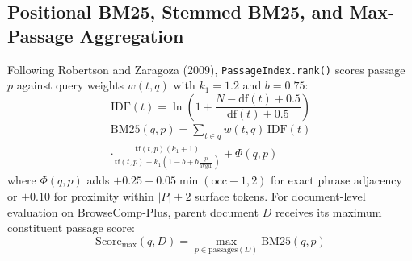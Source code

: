 \documentclass[conference]{IEEEtran}
\begin{document}
\subsection{Positional BM25, Stemmed BM25, and Max-Passage Aggregation}
Following Robertson and Zaragoza (2009), \texttt{PassageIndex.rank()} scores passage $p$ against query weights $w(t, q)$ with $k_1 = 1.2$ and $b = 0.75$:
\begin{equation}
\text{IDF}(t) = \ln\!\left(1 + \frac{N - \text{df}(t) + 0.5}{\text{df}(t) + 0.5}\right)
\end{equation}
\begin{multline}
\text{BM25}(q, p) = \sum_{t \in q} w(t, q)\,\text{IDF}(t)\\
\cdot\frac{\text{tf}(t, p)(k_1 + 1)}{\text{tf}(t, p) + k_1\!\left(1 - b + b\frac{|p|}{\text{avgdl}}\right)} + \Phi(q, p)
\end{multline}
where $\Phi(q, p)$ adds $+0.25 + 0.05\min(\text{occ}-1, 2)$ for exact phrase adjacency or $+0.10$ for proximity within $|P|+2$ surface tokens. For document-level evaluation on BrowseComp-Plus, parent document $D$ receives its maximum constituent passage score:
\begin{equation}
\text{Score}_{\text{max}}(q, D) = \max_{p \in \text{passages}(D)} \text{BM25}(q, p)
\end{equation}
\end{document}
